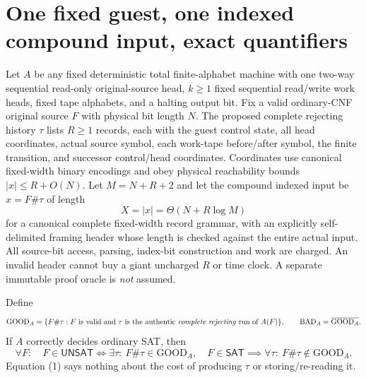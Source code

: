 \documentclass[11pt]{article}
\newcommand{\SAT}{\mathsf{SAT}}
\newcommand{\UNSAT}{\mathsf{UNSAT}}
\begin{document}
\section{One fixed guest, one indexed compound input, exact quantifiers}
Let $A$ be any fixed deterministic total finite-alphabet machine with one two-way sequential read-only original-source head, $k\ge1$ fixed sequential read/write work heads, fixed tape alphabets, and a halting output bit. Fix a valid ordinary-CNF original source $F$ with physical bit length $N$. The proposed complete rejecting history $\tau$ lists $R\ge1$ records, each with the guest control state, all head coordinates, actual source symbol, each work-tape before/after symbol, the finite transition, and successor control/head coordinates. Coordinates use canonical fixed-width binary encodings and obey physical reachability bounds $|x|\le R+O(N)$. Let $M=N+R+2$ and let the compound indexed input be $x=F\#\tau$ of length
\[
 X=|x|=\Theta(N+R\log M)
\]
for a canonical complete fixed-width record grammar, with an explicitly self-delimited framing header whose length is checked against the entire actual input. All source-bit access, parsing, index-bit construction and work are charged. An invalid header cannot buy a giant uncharged $R$ or time clock. A separate immutable proof oracle is \emph{not} assumed.

Define
\[
 \mathrm{GOOD}_A=\{F\#\tau:\text{$F$ is valid and $\tau$ is the authentic \emph{complete rejecting} run of $A(F)$}\},
 \qquad \mathrm{BAD}_A=\overline{\mathrm{GOOD}_A}.
\]
If $A$ correctly decides ordinary SAT, then
\[
 \forall F:\quad F\in\UNSAT\iff\exists\tau:\ F\#\tau\in\mathrm{GOOD}_A,
 \quad F\in\SAT\implies\forall\tau:\ F\#\tau\notin\mathrm{GOOD}_A.
 \tag{1}
\]
Equation (1) says nothing about the cost of producing $\tau$ or storing/re-reading it.
\end{document}
